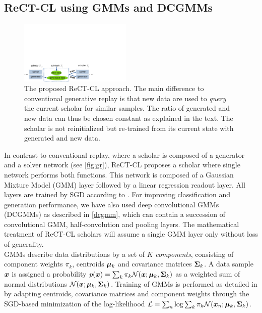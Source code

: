 \documentclass{article} %
\begin{document}
\subsection{ReCT-CL using GMMs and DCGMMs}\label{sec:gmm}
%
\begin{figure}[b]
    \centering
    \includegraphics*[height=3cm,page=2,viewport=0in 0in 6in 2in]{figs.pdf}
    \caption{The proposed ReCT-CL approach. The main difference to conventional generative replay is that new data are used to \textit{query} the current scholar for similar samples. The ratio of generated and new data can thus be chosen constant as explained in the text. The scholar is not reinitialized but re-trained from its current state with generated and new data.}
    \label{fig:var}
\end{figure}
%
In contrast to conventional replay, where a scholar is composed of a generator and a solver network (see \cref{fig:gr}), ReCT-CL proposes a scholar where single network performs both functions. This network is composed of a Gaussian Mixture Model (GMM) layer followed by a linear regression readout layer. All layers are trained by SGD according to \cite{sgdgmm}. For improving classification and generation performance, we have also used deep convolutional GMMs (DCGMMs) as described in \cref{dcgmm}, which can contain a succession of convolutional GMM, half-convolution and pooling layers. The mathematical treatment of ReCT-CL scholars will assume a single GMM layer only without loss of generality. 
\\
GMMs describe data distributions by a set of $K$ \textit{components}, consisting of component weights $\pi_k$, centroids ${\bm{\mu}}_k$ and covariance matrices ${\bm{\Sigma}}_k$. A data sample ${\bm{x}}$ is assigned a probability $p({\bm{x}}) = \sum_k \pi_k \mathcal N({\bm{x}} ; {\bm{\mu}}_k, {\bm{\Sigma}}_k)$ as a weighted sum of normal distributions $\mathcal N({\bm{x}}; {\bm{\mu}}_k, {\bm{\Sigma}}_k)$. Training of GMMs is performed as detailed in \cite{sgdgmm} by adapting centroids, covariance matrices and component weights through the SGD-based minimization of the log-likelihood $\mathcal L=\sum_n \log \sum_k \pi_k \mathcal N({\bm{x}}_n; {\bm{\mu}}_k,{\bm{\Sigma}}_k)$.
\\
\end{document}
